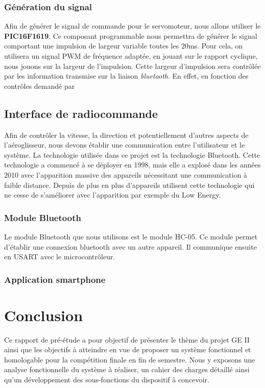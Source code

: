\documentclass[a4paper,12pt]{report}
\begin{document}
			\subsubsection{Génération du signal}
			Afin de générer le signal de commande pour le servomoteur, nous allons utiliser le \textbf{PIC16F1619}. Ce composant programmable nous permettra de générer le signal comportant une impulsion de largeur variable toutes les 20ms. Pour cela, on utilisera un signal PWM de fréquence adaptée, en jouant sur le rapport cyclique, nous jouons sur la largeur de l'impulsion. Cette largeur d'impulsion sera contrôlée par les information transmise sur la liaison \textit{bluetooth}. En effet, en fonction des contrôles demandé par 
		\subsection{Interface de radiocommande}
			Afin de contrôler la vitesse, la direction et potentiellement d'autres aspects de l'aéroglisseur, nous devons établir une communication entre l'utilisateur et le système. La technologie utilisée dans ce projet est la technologie Bluetooth. Cette technologie a commencé à se déployer en 1998, mais elle a explosé dans les années 2010 avec l'apparition massive des appareils nécessitant une communication à faible distance. Depuis de plus en plus d'appareils utilisent cette technologie qui ne cesse de s'améliorer avec l'apparition par exemple du Low Energy.
			\subsubsection{Module Bluetooth}
			Le module Bluetooth que nous utilisons est le module HC-05. Ce module permet d'établir une connexion bluetooth avec un autre appareil. Il communique ensuite en USART avec le microcontrôleur.
			\subsubsection{Application smartphone}
	
	\section{Conclusion}
	
	Ce rapport de pré-étude a pour objectif de présenter le thème du projet GE II ainsi que les objectifs à atteindre en vue de proposer un système fonctionnel et homologable pour la compétition finale en fin de semestre. Nous y exposons une analyse fonctionnelle du système à réaliser, un cahier des charges détaillé ainsi qu'un développement des sous-fonctions du dispositif à concevoir.
	
\end{document}
